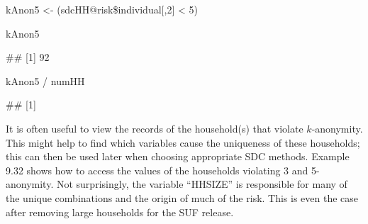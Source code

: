 \documentclass[letterpaper,10pt,english]{sphinxmanual}
\begin{document}
\begin{DUlineblock}{0em}
\item[] 
\item[] \sphinxcode{\sphinxupquote{\#\#}}
\item[] 
\item[] 
\item[] 
\item[] \sphinxcode{\sphinxupquote{\#\#}}
\item[] 
\item[] 
\item[] 
\item[] \sphinxcode{\sphinxupquote{-{-}-{-}-{-}-{-}-{-}-{-}-{-}-{-}-{-}-{-}-{-}-{-}-{-}-{-}-{-}-{-}-{-}-{-}-{-}-{-}-{-}-{-}-{-}-{-}-{-}-{-}-{-}-{-}-{-}-{-}-{-}-{-}-{-}-{-}-{-}-{-}-{-}}}
\end{DUlineblock}

\begin{DUlineblock}{0em}
\item[] 
\item[] kAnon5 \textless{}- (sdcHH@risk\$individual{[},2{]} \textless{} 5)
\end{DUlineblock}

kAnon5

\#\# {[}1{]} 92

\begin{DUlineblock}{0em}
\item[] 
\item[] kAnon5 / numHH
\end{DUlineblock}

\#\# {[}1{]} 

It is often useful to view the records of the household(s) that violate
\(k\)-anonymity. This might help to find which variables cause the
uniqueness of these households; this can then be used later when
choosing appropriate SDC methods. Example 9.32 shows how to access the
values of the households violating 3 and 5-anonymity. Not surprisingly,
the variable “HHSIZE” is responsible for many of the unique combinations
and the origin of much of the risk. This is even the case after removing
large households for the SUF release.
\end{document}
